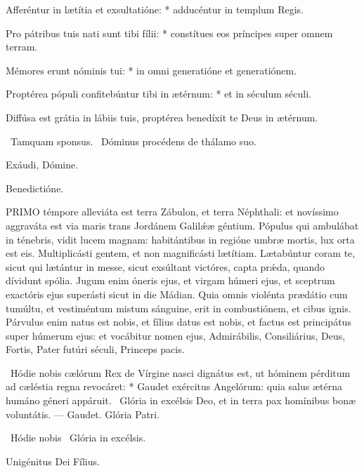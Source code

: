 Afferéntur in lætítia et exsultatióne: * adducéntur in templum Regis.

Pro pátribus tuis nati sunt tibi fílii: * constítues eos príncipes super omnem terram.

Mémores erunt nóminis tui: * in omni generatióne et generatiónem.

Proptérea pópuli confitebúntur tibi in ætérnum: * et in séculum séculi.

 Diffúsa est grátia in lábiis tuis, proptérea benedíxit te Deus in ætérnum.

\V\ Tamquam sponsus. \R\ Dóminus procédens de thálamo suo.

 Exáudi, Dómine.

 Benedictióne.



\lettrine[lines=2]{P}{RIMO} témpore alleviáta est terra Zábulon, et terra Néphthali: et novíssimo aggraváta est via maris trans Jordánem Galilǽæ géntium. Pópulus qui ambulábat in ténebris, vidit lucem magnam: habitántibus in regióne umbræ mortis, lux orta est eis. Multiplicásti gentem, et non magnificásti lætítiam. Lætabúntur coram te, sicut qui lætántur in messe, sicut exsúltant victóres, capta prǽda, quando dívidunt spólia. Jugum enim óneris ejus, et virgam húmeri ejus, et sceptrum exactóris ejus superásti sicut in die Mádian. Quia omnis violénta prædátio cum tumúltu, et vestiméntum mistum sánguine, erit in combustiónem, et cibus ignis. Párvulus enim natus est nobis, et fílius datus est nobis, et factus est principátus super húmerum ejus: et vocábitur nomen ejus, Admirábilis, Consiliárius, Deus, Fortis, Pater futúri séculi, Princeps pacis.

\R\ Hódie nobis cælórum Rex de Vírgine nasci dignátus est, ut hóminem pérditum ad cæléstia regna revocáret: * Gaudet exércitus Angelórum: quia salus ætérna humáno géneri appáruit. \V\ Glória in excélsis Deo, et in terra pax homínibus bonæ voluntátis. --- Gaudet. Glória Patri.

 \R\ Hódie nobis  \V\ Glória in excélsis.

 Unigénitus Dei Fílius.


